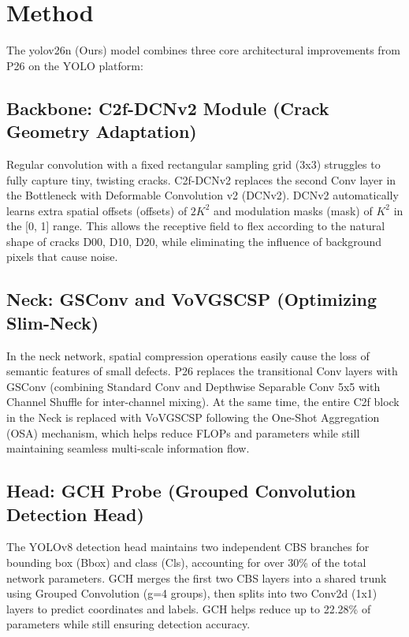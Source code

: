 \documentclass[conference]{IEEEtran}
\begin{document}
\section{Method}
The yolov26n (Ours) model combines three core architectural improvements from P26 on the YOLO platform:

\subsection{Backbone: C2f-DCNv2 Module (Crack Geometry Adaptation)}\label{AA}

Regular convolution with a fixed rectangular sampling grid (3x3) struggles to fully capture tiny, twisting cracks. C2f-DCNv2 replaces the second Conv layer in the Bottleneck with Deformable Convolution v2 (DCNv2). DCNv2 automatically learns extra spatial offsets (offsets) of $2K^2$ and modulation masks (mask) of $K^2$ in the [0, 1] range. This allows the receptive field to flex according to the natural shape of cracks D00, D10, D20, while eliminating the influence of background pixels that cause noise.

\subsection{Neck: GSConv and VoVGSCSP (Optimizing Slim-Neck)}

In the neck network, spatial compression operations easily cause the loss of semantic features of small defects. P26 replaces the transitional Conv layers with GSConv (combining Standard Conv and Depthwise Separable Conv 5x5 with Channel Shuffle for inter-channel mixing). At the same time, the entire C2f block in the Neck is replaced with VoVGSCSP following the One-Shot Aggregation (OSA) mechanism, which helps reduce FLOPs and parameters while still maintaining seamless multi-scale information flow.

\subsection{Head: GCH Probe (Grouped Convolution Detection Head)}

The YOLOv8 detection head maintains two independent CBS branches for bounding box (Bbox) and class (Cls), accounting for over 30\% of the total network parameters. GCH merges the first two CBS layers into a shared trunk using Grouped Convolution (g=4 groups), then splits into two Conv2d (1x1) layers to predict coordinates and labels. GCH helps reduce up to 22.28\% of parameters while still ensuring detection accuracy.
\noindent
\end{document}
